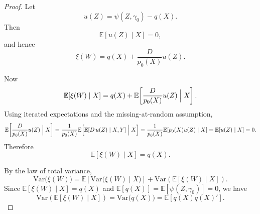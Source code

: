 \documentclass[12pt]{article}
\renewcommand{\(}{\left(}%
\renewcommand{\)}{\right)}%
\renewcommand{\[}{\left[}%
\renewcommand{\]}{\right]}%
\newtheorem{proof}{Proof.}}
\begin{document}
\begin{proof}
Let
\begin{equation*}
u(Z)=\psi(Z,\gamma_0)-q(X).
\end{equation*}
Then
\begin{equation*}
\mathbb{E}[u(Z)\mid X]=0,
\end{equation*}
and hence
\begin{equation*}
\xi(W)=q(X)+\frac{D}{p_0(X)}u(Z).
\end{equation*}

Now
\begin{equation*}
\mathbb{E}[\xi(W)\mid X]
=
q(X)+\mathbb{E}\!\left[\frac{D}{p_0(X)}u(Z)\Bigm| X\right].
\end{equation*}
Using iterated expectations and the missing-at-random assumption,
\begin{equation*}
\mathbb{E}\!\left[\frac{D}{p_0(X)}u(Z)\Bigm| X\right]
=
\frac{1}{p_0(X)}\mathbb{E}\!\left[\mathbb{E}[D\,u(Z)\mid X,Y]\Bigm|X\right]
=
\frac{1}{p_0(X)}\mathbb{E}[p_0(X)u(Z)\mid X]
=
\mathbb{E}[u(Z)\mid X]
=
0.
\end{equation*}
Therefore
\begin{equation*}
\mathbb{E}[\xi(W)\mid X]=q(X).
\end{equation*}

By the law of total variance,
\begin{equation*}
\mathrm{Var}\bigl(\xi(W)\bigr)
=
\mathbb{E}\!\left[\mathrm{Var}\bigl(\xi(W)\mid X\bigr)\right]
+
\mathrm{Var}\left(\mathbb{E}[\xi(W)\mid X]\right).
\end{equation*}
Since $\mathbb{E}[\xi(W)\mid X]=q(X)$ and $\mathbb{E}[q(X)]=\mathbb{E}[\psi(Z,\gamma_0)]=0$, we have
\begin{equation*}
\mathrm{Var}\left(\mathbb{E}[\xi(W)\mid X]\right)
=
\mathrm{Var}\bigl(q(X)\bigr)
=
\mathbb{E}[q(X)q(X)'].
\end{equation*}


\end{proof}
\end{document}
